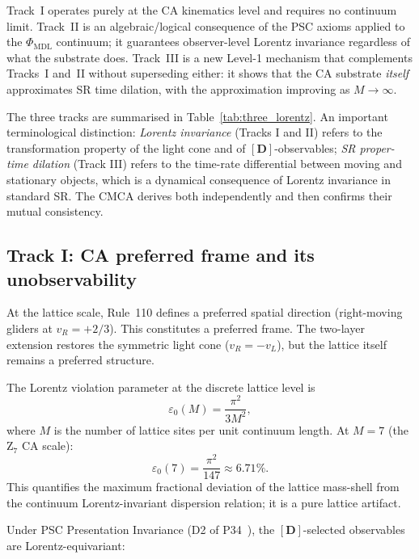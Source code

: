 \documentclass[11pt]{article}
\theoremstyle{remark}
\newcommand{\PHIMDL}{\Phi_{\mathrm{MDL}}}
\newcommand{\epsz}{\varepsilon_0}
\begin{document}
Track~I operates purely at the CA kinematics level and requires no continuum
limit.  Track~II is an algebraic/logical consequence of the PSC axioms applied
to the $\PHIMDL$ continuum; it guarantees observer-level Lorentz invariance
regardless of what the substrate does.  Track~III is a new Level-1 mechanism
that complements Tracks~I and~II without superseding either: it shows that
the CA substrate \emph{itself} approximates SR time dilation, with the
approximation improving as $M\to\infty$.

The three tracks are summarised in Table~\ref{tab:three_lorentz}.
An important terminological distinction: \emph{Lorentz invariance} (Tracks I
and II) refers to the transformation property of the light cone and of
$[\mathbf{D}]$-observables; \emph{SR proper-time dilation} (Track III) refers
to the time-rate differential between moving and stationary objects, which is
a dynamical consequence of Lorentz invariance in standard SR.  The CMCA
derives both independently and then confirms their mutual consistency.

\subsection{Track I: CA preferred frame and its unobservability}
\label{ssec:track1}

At the lattice scale, Rule~110 defines a preferred spatial direction
(right-moving gliders at $v_R=+2/3$).  This constitutes a preferred frame.
The two-layer extension restores the symmetric light cone ($v_R=-v_L$),
but the lattice itself remains a preferred structure.

The Lorentz violation parameter at the discrete lattice level is
\begin{equation}
  \label{eq:eps0}
  \epsz(M) = \frac{\pi^2}{3M^2},
\end{equation}
where $M$ is the number of lattice sites per unit continuum length.
At $M=7$ (the Z$_7$ CA scale):
\begin{equation}
  \label{eq:eps0_7}
  \epsz(7) = \frac{\pi^2}{147} \approx 6.71\%.
\end{equation}
This quantifies the maximum fractional deviation of the lattice mass-shell
from the continuum Lorentz-invariant dispersion relation; it is a
pure lattice artifact.

Under PSC Presentation Invariance (D2 of P34~\cite{SpivackGTEMobius}),
the $[\mathbf{D}]$-selected observables are Lorentz-equivariant:
\end{document}
